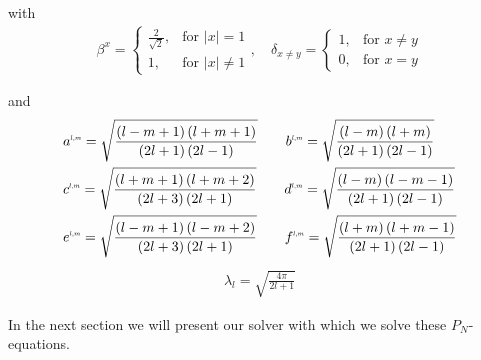 with
\begin{align*}
\label{eq:real_sh_basis}
\beta^{x}=
\left\{
\begin{array}{lr}
\frac{2}{\sqrt{2}}, & \text{for } \vert x\vert = 1\\
1, & \text{for } \vert x\vert \neq 1
\end{array}
\right.
,\quad
\delta_{x\neq y}=
\left\{
\begin{array}{lr}
1, & \text{for } x \neq y \\
0, & \text{for } x = y
\end{array}
\right.
\end{align*}

and
\begin{align*}
&
a^{\scaleto{l,m}{4pt}}= \sqrt{\frac{\left(l-m+1\right)\left(l+m+1\right)}{\left(2l+1\right)\left(2l-1\right)}} \qquad
b^{\scaleto{l,m}{4pt}}= \sqrt{\frac{\left(l-m\right)\left(l+m\right)}{\left(2l+1\right)\left(2l-1\right)}}
\\&
c^{\scaleto{l,m}{4pt}}= \sqrt{\frac{\left(l+m+1\right)\left(l+m+2\right)}{\left(2l+3\right)\left(2l+1\right)}} \qquad
d^{\scaleto{l,m}{4pt}}= \sqrt{\frac{\left(l-m\right)\left(l-m-1\right)}{\left(2l+1\right)\left(2l-1\right)}}
\\&
e^{\scaleto{l,m}{4pt}}= \sqrt{\frac{\left(l-m+1\right)\left(l-m+2\right)}{\left(2l+3\right)\left(2l+1\right)}} \qquad
f^{\scaleto{l,m}{4pt}}= \sqrt{\frac{\left(l+m\right)\left(l+m-1\right)}{\left(2l+1\right)\left(2l-1\right)}}
\end{align*}
\begin{align*}
\lambda_l=\sqrt{\frac{4\pi}{2l+1}}
\end{align*}

In the next section we will present our solver with which we solve these $P_N$-equations.